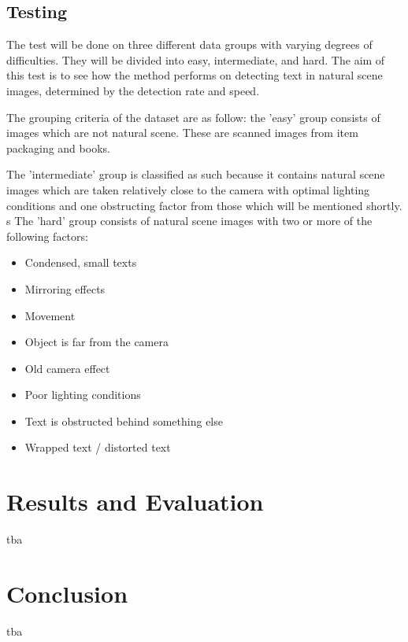 \documentclass[10pt, a4paper]{article}
\begin{document}
\clearpage

\subsection{Testing} %
\label{sub:testing}
The test will be done on three different data groups with varying degrees of difficulties. They will be divided into easy, intermediate, and hard. The aim of this test is to see how the method performs on detecting text in natural scene images, determined by the detection rate and speed.

The grouping criteria of the dataset are as follow: the 'easy' group consists of images which are not natural scene. These are scanned images from item packaging and books.

The 'intermediate' group is classified as such because it contains natural scene images which are taken relatively close to the camera with optimal lighting conditions and one obstructing factor from those which will be mentioned shortly.
s
The 'hard' group consists of natural scene images with two or more of the following factors:
\begin{itemize}
	\item Condensed, small texts
	\item Mirroring effects
	\item Movement
	\item Object is far from the camera
	\item Old camera effect
	\item Poor lighting conditions
	\item Text is obstructed behind something else
	\item Wrapped text / distorted text
\end{itemize}

\section{Results and Evaluation} %
\label{sec:evaluation}
tba

\section{Conclusion} %
\label{sec:conclusion}
tba

\newpage 


\end{document}
